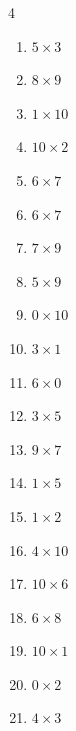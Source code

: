 \begin{multicols}{4}
\begin{enumerate}
  \item $5\times 3$
        \phantom{$=15$}

  \item $8\times 9$
        \phantom{$=72$}

  \item $1\times 10$
        \phantom{$=10$}

\columnbreak %

  \item $10\times 2$
        \phantom{$=20$}

  \item $6\times 7$
        \phantom{$=42$}

  \item $6\times 7$
        \phantom{$=42$}

  \item $7\times 9$
        \phantom{$=63$}

  \item $5\times 9$
        \phantom{$=45$}

  \item $0\times 10$
        \phantom{$=0$}

  \item $3\times 1$
        \phantom{$=3$}

  \item $6\times 0$
        \phantom{$=0$}

  \item $3\times 5$
        \phantom{$=15$}

  \item $9\times 7$
        \phantom{$=63$}

  \item $1\times 5$
        \phantom{$=5$}

  \item $1\times 2$
        \phantom{$=2$}

  \item $4\times 10$
        \phantom{$=40$}

  \item $10\times 6$
        \phantom{$=60$}

  \item $6\times 8$
        \phantom{$=48$}

  \item $10\times 1$
        \phantom{$=10$}

  \item $0\times 2$
        \phantom{$=0$}

  \item $4\times 3$
        \phantom{$=12$}


\end{enumerate}
\end{multicols}
